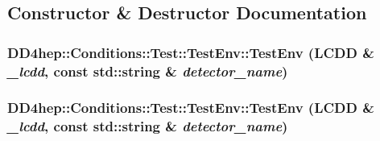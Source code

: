 \subsection{Constructor \& Destructor Documentation}
\hypertarget{struct_d_d4hep_1_1_conditions_1_1_test_1_1_test_env_a65ece677c712504466503c346b7c86ec}{
\subsubsection[{TestEnv}]{\setlength{\rightskip}{0pt plus 5cm}DD4hep::Conditions::Test::TestEnv::TestEnv (LCDD \& {\em \_\-lcdd}, \/  const std::string \& {\em detector\_\-name})}}
\label{struct_d_d4hep_1_1_conditions_1_1_test_1_1_test_env_a65ece677c712504466503c346b7c86ec}
\hypertarget{struct_d_d4hep_1_1_conditions_1_1_test_1_1_test_env_a65ece677c712504466503c346b7c86ec}{
\subsubsection[{TestEnv}]{\setlength{\rightskip}{0pt plus 5cm}DD4hep::Conditions::Test::TestEnv::TestEnv (LCDD \& {\em \_\-lcdd}, \/  const std::string \& {\em detector\_\-name})}}
\label{struct_d_d4hep_1_1_conditions_1_1_test_1_1_test_env_a65ece677c712504466503c346b7c86ec}


